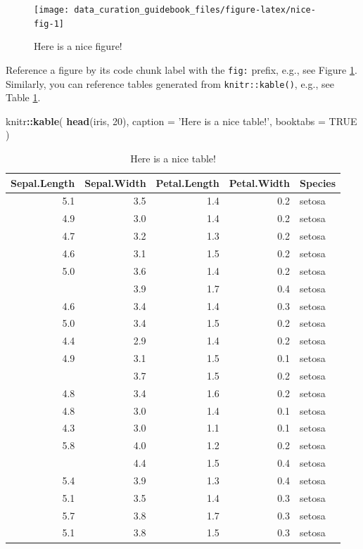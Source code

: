 \documentclass[
]{book}
\newenvironment{Shaded}{\begin{snugshade}}{\end{snugshade}}
\newcommand{\DataTypeTok}[1]{\textcolor[rgb]{0.13,0.29,0.53}{#1}}
\newcommand{\DecValTok}[1]{\textcolor[rgb]{0.00,0.00,0.81}{#1}}
\newcommand{\KeywordTok}[1]{\textcolor[rgb]{0.13,0.29,0.53}{\textbf{#1}}}
\newcommand{\NormalTok}[1]{#1}
\newcommand{\OperatorTok}[1]{\textcolor[rgb]{0.81,0.36,0.00}{\textbf{#1}}}
\newcommand{\OtherTok}[1]{\textcolor[rgb]{0.56,0.35,0.01}{#1}}
\newcommand{\StringTok}[1]{\textcolor[rgb]{0.31,0.60,0.02}{#1}}
\begin{document}
\begin{figure}

{\centering \texttt{[image: data\_curation\_guidebook\_files/figure-latex/nice-fig-1]} 

}

\caption{Here is a nice figure!}\label{fig:nice-fig}
\end{figure}

Reference a figure by its code chunk label with the \texttt{fig:} prefix, e.g., see Figure \ref{fig:nice-fig}. Similarly, you can reference tables generated from \texttt{knitr::kable()}, e.g., see Table \ref{tab:nice-tab}.

\begin{Shaded}
\begin{Highlighting}[]
\NormalTok{knitr}\OperatorTok{::}\KeywordTok{kable}\NormalTok{(}
  \KeywordTok{head}\NormalTok{(iris, }\DecValTok{20}\NormalTok{), }\DataTypeTok{caption =} \StringTok{'Here is a nice table!'}\NormalTok{,}
  \DataTypeTok{booktabs =} \OtherTok{TRUE}
\NormalTok{)}
\end{Highlighting}
\end{Shaded}

\begin{table}

\caption{\label{tab:nice-tab}Here is a nice table!}
\centering
\begin{tabular}[t]{rrrrl}
\toprule
Sepal.Length & Sepal.Width & Petal.Length & Petal.Width & Species\\
\midrule
5.1 & 3.5 & 1.4 & 0.2 & setosa\\
4.9 & 3.0 & 1.4 & 0.2 & setosa\\
4.7 & 3.2 & 1.3 & 0.2 & setosa\\
4.6 & 3.1 & 1.5 & 0.2 & setosa\\
5.0 & 3.6 & 1.4 & 0.2 & setosa\\
\addlinespace
5.4 & 3.9 & 1.7 & 0.4 & setosa\\
4.6 & 3.4 & 1.4 & 0.3 & setosa\\
5.0 & 3.4 & 1.5 & 0.2 & setosa\\
4.4 & 2.9 & 1.4 & 0.2 & setosa\\
4.9 & 3.1 & 1.5 & 0.1 & setosa\\
\addlinespace
5.4 & 3.7 & 1.5 & 0.2 & setosa\\
4.8 & 3.4 & 1.6 & 0.2 & setosa\\
4.8 & 3.0 & 1.4 & 0.1 & setosa\\
4.3 & 3.0 & 1.1 & 0.1 & setosa\\
5.8 & 4.0 & 1.2 & 0.2 & setosa\\
\addlinespace
5.7 & 4.4 & 1.5 & 0.4 & setosa\\
5.4 & 3.9 & 1.3 & 0.4 & setosa\\
5.1 & 3.5 & 1.4 & 0.3 & setosa\\
5.7 & 3.8 & 1.7 & 0.3 & setosa\\
5.1 & 3.8 & 1.5 & 0.3 & setosa\\
\bottomrule
\end{tabular}
\end{table}
\end{document}
